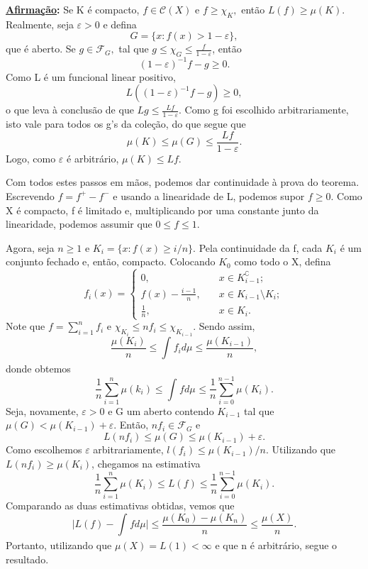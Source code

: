 \documentclass[measure_theory.tex]{subfiles}
\begin{document}
\begin{proof*}
	\textbf{\underline{Afirmação}:} Se K é compacto, \(f\in \mathcal{C}(X)\) e \(f \geq \chi_{K},\) então \(L(f) \geq \mu (K).\)
	Realmente, seja \(\varepsilon  > 0\) e defina
	\[
		G = \{x: f(x) > 1 - \varepsilon \},
	\]
	que é aberto. Se \(g\in \mathcal{F}_{G},\) tal que \(g \leq \chi_{G}\leq \frac{f}{1-\varepsilon }\), então
	\[
		(1-\varepsilon )^{-1}f - g\geq 0.
	\]
	Como L é um funcional linear positivo,
	\[
		L((1-\varepsilon )^{-1}f - g)\geq 0,
	\]
	o que leva à conclusão de que \(Lg \leq \frac{Lf}{1-\varepsilon }\). Como g foi escolhido arbitrariamente, isto vale para todos os g's da coleção, do que segue que
	\[
		\mu (K) \leq \mu (G) \leq \frac{Lf}{1-\varepsilon }.
	\]
	Logo, como \(\varepsilon \) é arbitrário, \(\mu (K) \leq Lf\). \qedsymbol

	Com todos estes passos em mãos, podemos dar continuidade à prova do teorema. Escrevendo \(f = f^{+}-f^{-}\) e usando a linearidade de L, podemos supor \(f \geq 0\). Como X é compacto, f é limitado e, multiplicando por uma
	constante junto da linearidade, podemos assumir que \(0\leq f\leq 1.\)

	Agora, seja \(n\geq 1\) e \(K_{i} = \{x: f(x)\geq i/n\}\). Pela continuidade da f, cada \(K_{i}\) é um conjunto fechado e, então, compacto. Colocando \(K_{0}\) como todo o X, defina
	\[
		f_{i}(x) = \left\{\begin{array}{ll}
			0,                    & \quad x\in K_{i-1}^{\complement};   \\
			f(x) - \frac{i-1}{n}, & \quad x\in K_{i-1}\setminus{K_{i}}; \\
			\frac{1}{n},          & \quad x\in K_{i}.
		\end{array}\right.
	\]
	Note que \(f = \sum\limits_{i=1}^{n}f_{i}\) e \(\chi_{K_{i}} \leq nf_{i} \leq \chi_{K_{i-1}}.\) Sendo assim,
	\[
		\frac{\mu (K_{i})}{n}\leq \int_{}^{}f_{i}d\mu \leq \frac{\mu (K_{i-1})}{n},
	\]
	donde obtemos
	\[
		\frac{1}{n}\sum\limits_{i=1}^{n}\mu (k_{i})\leq \int_{}f d\mu_{}\leq \frac{1}{n}\sum\limits_{i=0}^{n-1}\mu (K_{i}).
	\]
	Seja, novamente, \(\varepsilon > 0\) e G um aberto contendo \(K_{i-1}\) tal que \(\mu (G) < \mu (K_{i-1}) + \varepsilon .\) Então, \(nf_{i}\in \mathcal{F}_{G}\) e
	\[
		L(nf_{i}) \leq \mu (G) \leq \mu (K_{i-1})+\varepsilon .
	\]
	Como escolhemos \(\varepsilon \) arbitrariamente, \(l(f_{i}) \leq \mu (K_{i-1})/n\). Utilizando que \(L(nf_{i}) \geq \mu (K_{i})\), chegamos na estimativa
	\[
		\frac{1}{n}\sum\limits_{i=1}^{n}\mu (K_{i}) \leq L(f) \leq \frac{1}{n}\sum\limits_{i=0}^{n-1}\mu (K_{i}).
	\]
	Comparando as duas estimativas obtidas, vemos que
	\[
		\biggl\vert L(f) - \int_{}^{}fd\mu  \biggr\vert \leq \frac{\mu (K_{0}) - \mu (K_{n})}{n} \leq \frac{\mu (X)}{n}.
	\]
	Portanto, utilizando que \(\mu (X) = L(1) < \infty\) e que n é arbitrário, segue o resultado. \qedsymbol
\end{proof*}
\end{document}
